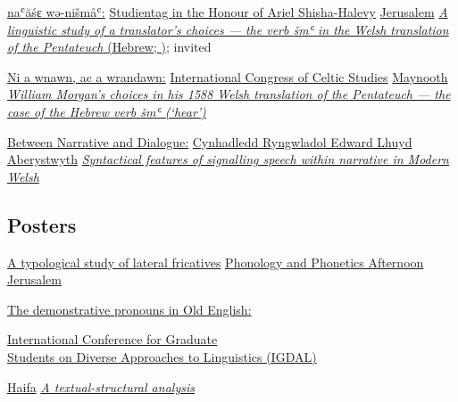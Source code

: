 	{\href{https://ac.digitalwords.net/\#talks-2012-05-29}{na{ʿ}ăśɛ wə-nišmå{ʿ}:}}
	{\href{https://ac.digitalwords.net/supplementary/2012-05-29-invitation.pdf}{Studientag in the Honour of Ariel Shisha-Halevy}}
	{\href{https://huji.ac.il/}{Jerusalem}}
	{}
	{\href{https://ac.digitalwords.net/\#talks-2012-05-29}{\emph{A linguistic study of a translator’s choices — the verb \emph{šm{ʿ}} in the Welsh translation of the Pentateuch} (Hebrew; )}; invited}

	{\href{https://ac.digitalwords.net/\#talks-2011-08-04}{Ni a wnawn, ac a wrandawn:}}
	{\href{http://celticstudiescongress.org/iccsxiv/}{ International Congress of Celtic Studies}}
	{\href{https://maynoothuniversity.ie/}{Maynooth}}
	{}
	{\href{https://ac.digitalwords.net/\#talks-2011-08-04}{\emph{William Morgan’s choices in his 1588 Welsh translation of the Pentateuch — the case of the Hebrew verb \emph{šm{ʿ}} (‘hear’)}}}

	{\href{https://ac.digitalwords.net/\#talks-2009-07-01}{Between Narrative and Dialogue:}}
	{\href{https://web.archive.org/web/20090505210352/http://www.wales.ac.uk:80/defaultpage.asp?page=E4063}{Cynhadledd Ryngwladol Edward Lhuyd}}
	{\href{https://uwtsd.ac.uk/cawcs/}{Aberystwyth}}
	{}
	{\href{https://ac.digitalwords.net/\#talks-2009-07-01}{\emph{Syntactical features of signalling speech within narrative in Modern Welsh}}}

	

\subsection{Posters}

	{\href{https://ac.digitalwords.net/\#posters-2019-04-10}{A typological study of lateral fricatives}}
	{\href{https://en.linguistics.huji.ac.il/event/phonology-and-phonetics-afternoon}{Phonology and Phonetics Afternoon}}
	{\href{https://huji.ac.il/}{Jerusalem}}
	{}
	{}

	{\href{https://ac.digitalwords.net/\#posters-2018-04-23}{The demonstrative pronouns in Old English:}}
	{\parbox[t]{0.8\textwidth}{\href{https://igdal.wordpress.com/previous-conferences/igdal-6/}{ International Conference for Graduate\\Students on Diverse Approaches to Linguistics (IGDAL)}}}
	{\href{https://haifa.ac.il/}{Haifa}}
	{}
	{\href{https://ac.digitalwords.net/\#posters-2018-04-23}{\emph{A textual-structural analysis}}}



